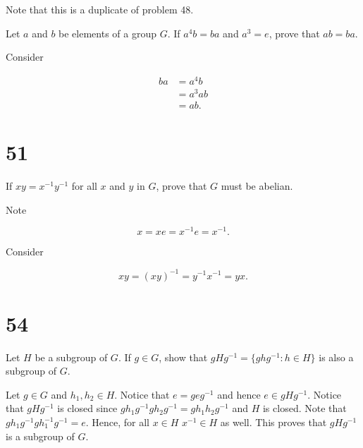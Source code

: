 \documentclass[a4paper]{article}
\begin{document}
Note that this is a duplicate of problem 48.

Let $a$ and $b$ be elements of a group $G$. If $a^4b = ba$ and $a^3 = e$, prove that $ab = ba$.
\vspace{\baselineskip}

Consider

\begin{align*}
ba &= a^4b \\
&= a^3 ab \\
&= ab.
\end{align*}


\section*{51}

If $xy = x^{-1} y^{-1}$ for all $x$ and $y$ in $G$, prove that $G$ must be abelian.

\vspace{\baselineskip}

Note 

$$x = xe = x^{-1}e = x^{-1}.$$

Consider

$$xy = (xy)^{-1} = y^{-1} x^{-1} = yx.$$


\section*{54}

Let $H$ be a subgroup of $G$. If $g \in G$, show that $gHg^{-1} = \{ghg^{-1}: h \in H \}$ is also a subgroup of $G$.

\vspace{\baselineskip}

Let $g \in G$ and $h_1, h_2 \in H$. Notice that $e = geg^{-1}$ and hence $e \in gHg^{-1}$. Notice that $gHg^{-1}$ is closed since $gh_1g^{-1} g h_2 g^{-1} = g h_1 h_2 g^{-1}$ and $H$ is closed. Note that $g h_1 g^{-1} g h_1^{-1} g^{-1} = e$. Hence, for all $x \in H$ $x^{-1} \in H$ as well. This proves that $gHg^{-1}$ is a subgroup of $G$.
\end{document}
